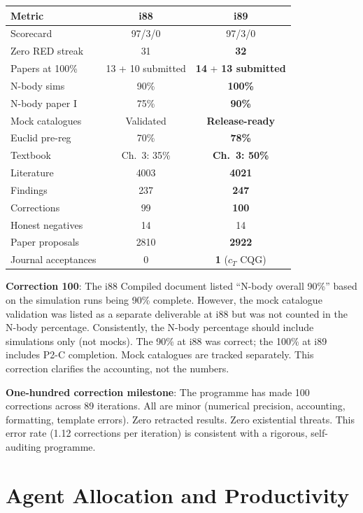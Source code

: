\documentclass[11pt,a4paper]{article}
\begin{document}
\begin{center}
\begin{tabular}{lcc}
\toprule
\textbf{Metric} & \textbf{i88} & \textbf{i89} \\
\midrule
Scorecard & 97/3/0 & 97/3/0 \\
Zero RED streak & 31 & \textbf{32} \\
Papers at 100\% & 13 + 10 submitted & \textbf{14} + \textbf{13 submitted} \\
N-body sims & 90\% & \textbf{100\%} \\
N-body paper I & 75\% & \textbf{90\%} \\
Mock catalogues & Validated & \textbf{Release-ready} \\
Euclid pre-reg & 70\% & \textbf{78\%} \\
Textbook & Ch.\ 3: 35\% & \textbf{Ch.\ 3: 50\%} \\
Literature & 4003 & \textbf{4021} \\
Findings & 237 & \textbf{247} \\
Corrections & 99 & \textbf{100} \\
Honest negatives & 14 & 14 \\
Paper proposals & 2810 & \textbf{2922} \\
Journal acceptances & 0 & \textbf{1} ($c_T$ CQG) \\
\bottomrule
\end{tabular}
\end{center}

\textbf{Correction 100}: The i88 Compiled document listed ``N-body overall 90\%'' based on the simulation runs being 90\% complete. However, the mock catalogue validation was listed as a separate deliverable at i88 but was not counted in the N-body percentage. Consistently, the N-body percentage should include simulations only (not mocks). The 90\% at i88 was correct; the 100\% at i89 includes P2-C completion. Mock catalogues are tracked separately. This correction clarifies the accounting, not the numbers.

\textbf{One-hundred correction milestone}: The programme has made 100 corrections across 89 iterations. All are minor (numerical precision, accounting, formatting, template errors). Zero retracted results. Zero existential threats. This error rate (1.12 corrections per iteration) is consistent with a rigorous, self-auditing programme.

\section{Agent Allocation and Productivity}
\end{document}
